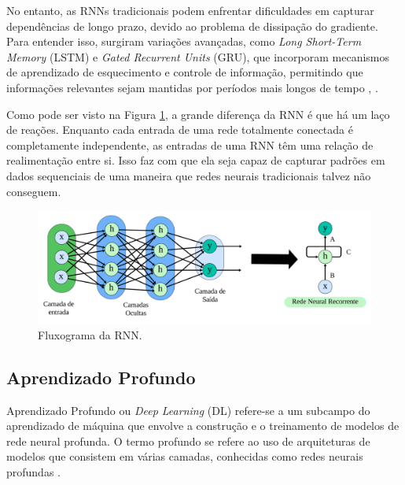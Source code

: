   No entanto, as RNNs tradicionais podem enfrentar dificuldades em capturar dependências de longo prazo, devido ao problema de dissipação do gradiente. Para entender isso, surgiram variações avançadas, como \textit{Long Short-Term Memory} (LSTM)  e \textit{Gated Recurrent Units} (GRU), que incorporam mecanismos de aprendizado de esquecimento e controle de informação, permitindo que informações relevantes sejam mantidas por períodos mais longos de tempo \cite{WANG2023116247}, \cite{ZHAO2023114136}.
 
 Como pode ser visto na Figura \ref{fig:rnn1}, a grande diferença da RNN é que há um laço de reações. Enquanto cada entrada de uma rede totalmente conectada é completamente independente, as entradas de uma RNN têm uma relação de realimentação entre si. Isso faz com que ela seja capaz de capturar padrões em dados sequenciais de uma maneira que redes neurais tradicionais talvez não conseguem.
  
 \begin{figure}[!htb]
 	\centering
 	\caption{Fluxograma da RNN.}
 	\label{fig:rnn1}
 	\includegraphics[width=\linewidth]{Modelos/Figuras/rnn1.pdf}
 
 \end{figure}
 
  \subsection{Aprendizado Profundo}

 Aprendizado Profundo ou \textit{Deep Learning} (DL) refere-se a um subcampo do aprendizado de máquina que envolve a construção e o treinamento de modelos de rede neural profunda. O termo profundo se refere ao uso de arquiteturas de modelos que consistem em várias camadas, conhecidas como redes neurais profundas \cite{KOTHONA2023101149}.
 
 
